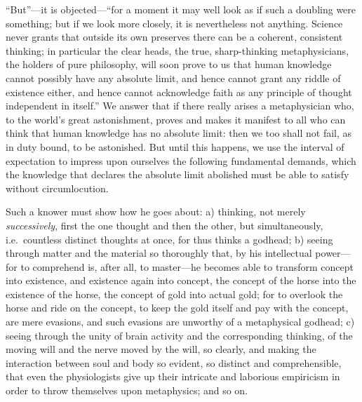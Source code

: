 \documentclass[12pt]{book}
\newcommand{\opage}[1]{\marginnote{\footnotesize\textit{[#1]}}}
\begin{document}
``But''---it is objected---``for a moment it may well look as if such a
doubling were something; but if we look more closely, it is nevertheless
not anything. Science never grants that outside its own preserves there
can be a coherent, consistent thinking; in particular the clear heads,
the true, sharp-thinking metaphysicians, the holders of pure philosophy,
will soon prove to us that human knowledge cannot possibly have any
absolute limit, and hence cannot grant any riddle of existence either,
and hence cannot acknowledge faith as any principle of thought
independent in itself.'' We answer that if there really arises a
metaphysician who, to the world's great astonishment, proves and makes
it manifest to all who can think that human knowledge has no absolute
limit: then we too shall not fail, as in duty bound, to be astonished.
But until this happens, we use the interval of expectation to impress
upon ourselves the following fundamental demands, which the knowledge
that declares the absolute limit abolished must be able to satisfy
without circumlocution.

Such a knower must show how he goes about: a) thinking, not merely
\textit{successively}, first the one thought and then the other, but
simultaneously, i.e.\ countless distinct thoughts at once, for thus
thinks
\opage{144}\setcounter{footnote}{0}%
a godhead; b) seeing through matter and the material so thoroughly that,
by his intellectual power---for to comprehend is, after all, to
master---he becomes able to transform concept into existence, and
existence again into concept, the concept of the horse into the
existence of the horse, the concept of gold into actual gold; for to
overlook the horse and ride on the concept, to keep the gold itself and
pay with the concept, are mere evasions, and such evasions are unworthy
of a metaphysical godhead; c) seeing through the unity of brain activity
and the corresponding thinking, of the moving will and the nerve moved
by the will, so clearly, and making the interaction between soul and
body so evident, so distinct and comprehensible, that even the
physiologists give up their intricate and laborious empiricism in order
to throw themselves upon metaphysics; and so on.
\end{document}
